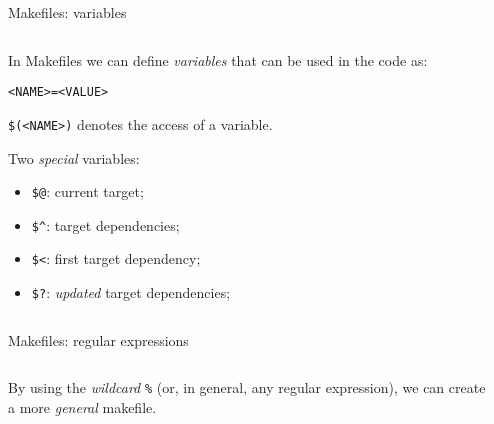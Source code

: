 \begin{frame}[fragile]{Makefiles: variables}
    \begin{columns}[c]
      \begin{column}{0.48\textwidth}
          In Makefiles we can define \emph{variables} that can be used in the code as:
        \begin{lstlisting}
<NAME>=<VALUE>\end{lstlisting} \vspace{3mm}
    
        \texttt{\$(<NAME>)} denotes the access of a variable. \vspace{3mm}

        Two \textit{special} variables:
        \begin{itemize}
            \makeatletter
            \item \texttt{\$@}: current target;
            \item \texttt{\$\^}: target dependencies;
            \item \texttt{\$<}: first target dependency;
            \item \texttt{\$?}: \textit{updated} target dependencies;
        \end{itemize}
        

        
      \end{column}
      \begin{column}{0.52\textwidth}
          
      \end{column}
    \end{columns}
\end{frame}

\begin{frame}[fragile]{Makefiles: regular expressions}
    \begin{columns}[c]
      \begin{column}{0.42\textwidth}
          By using the \emph{wildcard} \texttt{\%} (or, in general, any regular expression), we can create a more \textit{general} makefile.
      \end{column}
      \begin{column}{0.54\textwidth}
          
      \end{column}
    \end{columns}
\end{frame}

